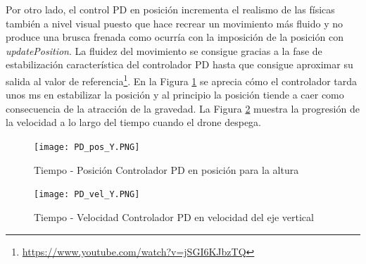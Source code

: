 Por otro lado, el control PD en posición incrementa el realismo de las físicas también a nivel visual puesto que hace recrear un movimiento más fluido y no produce una brusca frenada como ocurría con la imposición de la posición con \textit{updatePosition}. La fluidez del movimiento se consigue gracias a la fase de estabilización característica del controlador PD hasta que consigue aproximar su salida al valor de referencia\footnote{\url{https://www.youtube.com/watch?v=jSGI6KJbzTQ}}. En la Figura \ref{fig:pos-ejeY} se aprecia cómo el controlador tarda unos ms en estabilizar la posición y al principio la posición tiende a caer como consecuencia de la atracción de la gravedad. La Figura \ref{fig:vel-ejeY} muestra la progresión de la velocidad a lo largo del tiempo cuando el drone despega.

\begin{figure}[h!]
    \centering
    \texttt{[image: PD\_pos\_Y.PNG]}
    \caption{Tiempo - Posición Controlador PD en posición para la altura}
    \label{fig:pos-ejeY}
\end{figure}

\begin{figure}[h!]
    \centering
    \texttt{[image: PD\_vel\_Y.PNG]}
    \caption{Tiempo - Velocidad Controlador PD en velocidad del eje vertical}
    \label{fig:vel-ejeY}
\end{figure}

